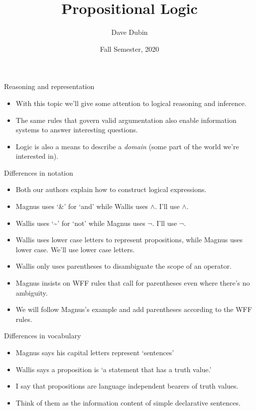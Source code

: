 \documentclass[
  ignorenonframetext,
]{beamer}
\title{Propositional Logic}
\author{Dave Dubin}
\date{Fall Semester, 2020}
\providecommand{\tightlist}{%
  \setlength{\itemsep}{0pt}\setlength{\parskip}{0pt}}
\begin{document}
\frame{\titlepage}

\begin{frame}{Reasoning and representation}
\protect\hypertarget{reasoning-and-representation}{}

\begin{itemize}[<+->]
\tightlist
\item
  With this topic we'll give some attention to logical reasoning and
  inference.
\item
  The same rules that govern valid argumentation also enable information
  systems to answer interesting questions.
\item
  Logic is also a means to describe a \emph{domain} (some part of the
  world we're interested in).
\end{itemize}

\end{frame}

\begin{frame}{Differences in notation}
\protect\hypertarget{differences-in-notation}{}

\begin{itemize}[<+->]
\tightlist
\item
  Both our authors explain how to construct logical expressions.
\item
  Magnus uses `\&' for `and' while Wallis uses \(\wedge\). I'll use
  \(\wedge\).
\item
  Wallis uses `\textasciitilde{}' for `not' while Magnus uses \(\neg\).
  I'll use \(\neg\).
\item
  Wallis uses lower case letters to represent propositions, while Magnus
  uses lower case. We'll use lower case letters.
\item
  Wallis only uses parentheses to disambiguate the scope of an operator.
\item
  Magnus insists on WFF rules that call for parentheses even where
  there's no ambiguity.
\item
  We will follow Magnus's example and add parentheses according to the
  WFF rules.
\end{itemize}

\end{frame}

\begin{frame}{Differences in vocabulary}
\protect\hypertarget{differences-in-vocabulary}{}

\begin{itemize}[<+->]
\tightlist
\item
  Magnus says his capital letters represent `sentences'
\item
  Wallis says a proposition is `a statement that has a truth value.'
\item
  I say that propositions are language independent bearers of truth
  values.
\item
  Think of them as the information content of simple declarative
  sentences.
\end{itemize}

\end{frame}
\end{document}
